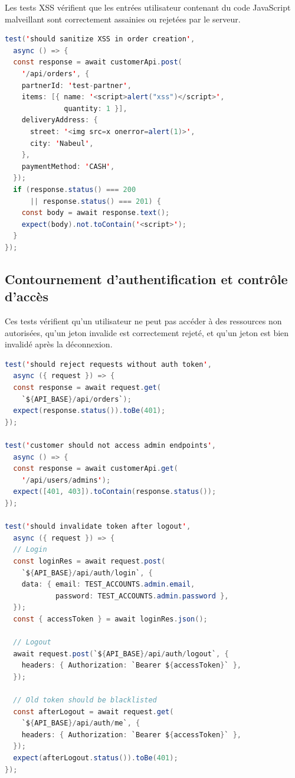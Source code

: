 Les tests XSS vérifient que les entrées utilisateur contenant du code JavaScript
malveillant sont correctement assainies ou rejetées par le serveur.

\begin{lstlisting}[language=Java, caption={Tests XSS -- security.api.spec.ts}, label={lst:xss-tests}]
test('should sanitize XSS in order creation',
  async () => {
  const response = await customerApi.post(
    '/api/orders', {
    partnerId: 'test-partner',
    items: [{ name: '<script>alert("xss")</script>',
              quantity: 1 }],
    deliveryAddress: {
      street: '<img src=x onerror=alert(1)>',
      city: 'Nabeul',
    },
    paymentMethod: 'CASH',
  });
  if (response.status() === 200
      || response.status() === 201) {
    const body = await response.text();
    expect(body).not.toContain('<script>');
  }
});
\end{lstlisting}

\subsection{Contournement d'authentification et contrôle d'accès}

Ces tests vérifient qu'un utilisateur ne peut pas accéder à des ressources non
autorisées, qu'un jeton invalide est correctement rejeté, et qu'un jeton est bien
invalidé après la déconnexion.

\begin{lstlisting}[language=Java, caption={Tests d'authentification et de contrôle d'accès}, label={lst:auth-bypass}]
test('should reject requests without auth token',
  async ({ request }) => {
  const response = await request.get(
    `${API_BASE}/api/orders`);
  expect(response.status()).toBe(401);
});

test('customer should not access admin endpoints',
  async () => {
  const response = await customerApi.get(
    '/api/users/admins');
  expect([401, 403]).toContain(response.status());
});

test('should invalidate token after logout',
  async ({ request }) => {
  // Login
  const loginRes = await request.post(
    `${API_BASE}/api/auth/login`, {
    data: { email: TEST_ACCOUNTS.admin.email,
            password: TEST_ACCOUNTS.admin.password },
  });
  const { accessToken } = await loginRes.json();

  // Logout
  await request.post(`${API_BASE}/api/auth/logout`, {
    headers: { Authorization: `Bearer ${accessToken}` },
  });

  // Old token should be blacklisted
  const afterLogout = await request.get(
    `${API_BASE}/api/auth/me`, {
    headers: { Authorization: `Bearer ${accessToken}` },
  });
  expect(afterLogout.status()).toBe(401);
});
\end{lstlisting}

